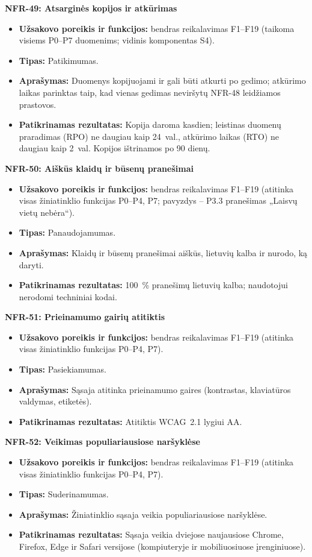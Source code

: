\noindent\textbf{NFR-49: Atsarginės kopijos ir atkūrimas}
\begin{itemize}
    \item \textbf{Užsakovo poreikis ir funkcijos:} bendras reikalavimas F1--F19 (taikoma visiems P0--P7 duomenims; vidinis komponentas S4).
    \item \textbf{Tipas:} Patikimumas.
    \item \textbf{Aprašymas:} Duomenys kopijuojami ir gali būti atkurti po gedimo; atkūrimo laikas parinktas taip, kad vienas gedimas neviršytų NFR-48 leidžiamos prastovos.
    \item \textbf{Patikrinamas rezultatas:} Kopija daroma kasdien; leistinas duomenų praradimas (RPO) ne daugiau kaip 24~val., atkūrimo laikas (RTO) ne daugiau kaip 2~val. Kopijos ištrinamos po 90 dienų.
\end{itemize}


\noindent\textbf{NFR-50: Aiškūs klaidų ir būsenų pranešimai}
\begin{itemize}
    \item \textbf{Užsakovo poreikis ir funkcijos:} bendras reikalavimas F1--F19 (atitinka visas žiniatinklio funkcijas P0--P4, P7; pavyzdys -- P3.3 pranešimas „Laisvų vietų nebėra“).
    \item \textbf{Tipas:} Panaudojamumas.
    \item \textbf{Aprašymas:} Klaidų ir būsenų pranešimai aiškūs, lietuvių kalba ir nurodo, ką daryti.
    \item \textbf{Patikrinamas rezultatas:} 100~\% pranešimų lietuvių kalba; naudotojui nerodomi techniniai kodai.
\end{itemize}

\noindent\textbf{NFR-51: Prieinamumo gairių atitiktis}
\begin{itemize}
    \item \textbf{Užsakovo poreikis ir funkcijos:} bendras reikalavimas F1--F19 (atitinka visas žiniatinklio funkcijas P0--P4, P7).
    \item \textbf{Tipas:} Pasiekiamumas.
    \item \textbf{Aprašymas:} Sąsaja atitinka prieinamumo gaires (kontrastas, klaviatūros valdymas, etiketės).
    \item \textbf{Patikrinamas rezultatas:} Atitiktis WCAG~2.1 lygiui AA.
\end{itemize}

\noindent\textbf{NFR-52: Veikimas populiariausiose naršyklėse}
\begin{itemize}
    \item \textbf{Užsakovo poreikis ir funkcijos:} bendras reikalavimas F1--F19 (atitinka visas žiniatinklio funkcijas P0--P4, P7).
    \item \textbf{Tipas:} Suderinamumas.
    \item \textbf{Aprašymas:} Žiniatinklio sąsaja veikia populiariausiose naršyklėse.
    \item \textbf{Patikrinamas rezultatas:} Sąsaja veikia dviejose naujausiose Chrome, Firefox, Edge ir Safari versijose (kompiuteryje ir mobiliuosiuose įrenginiuose).
\end{itemize}

